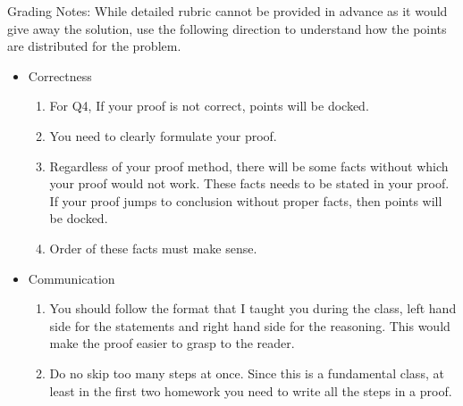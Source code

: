 \documentclass[12pt]{exam}
\begin{document}
Grading Notes:
While detailed rubric cannot be provided in advance as it would give away the solution, use the following direction to understand how the points are distributed for the problem.
\begin{itemize}
    \item Correctness
        \begin{enumerate}
            \item For Q4, If your proof is not correct, points will be docked.
            \item You need to clearly formulate your proof.
            \item Regardless of your proof method, there will be some facts without which your proof would not work. These facts needs to be stated in your proof. If your proof jumps to conclusion without proper facts, then points will be docked.
            \item Order of these facts must make sense. 
        \end{enumerate}
        \subitem  
       
    \item Communication 
    \begin{enumerate}
        \item You should follow the format that I taught you during the class, left hand side for the statements and right hand side for the reasoning. This would make the proof easier to grasp to the reader.
        \item Do no skip too many steps at once. Since this is a fundamental class, at least in the first two homework you need to write all the steps in a proof.  
    \end{enumerate}
        
\end{itemize}
\end{document}
